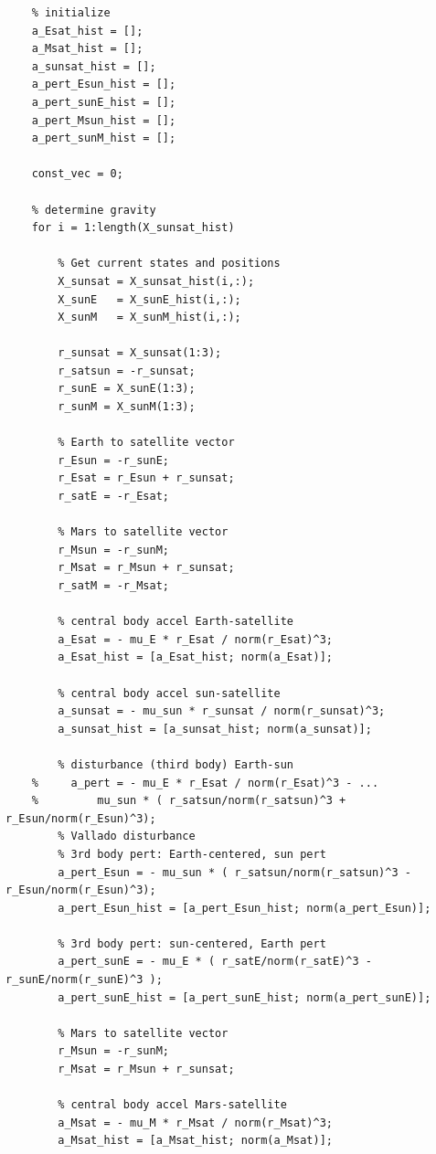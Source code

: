 \documentclass[conf]{new-aiaa}
\begin{document}
\begin{lstlisting}
    % initialize 
    a_Esat_hist = []; 
    a_Msat_hist = []; 
    a_sunsat_hist = []; 
    a_pert_Esun_hist = []; 
    a_pert_sunE_hist = []; 
    a_pert_Msun_hist = []; 
    a_pert_sunM_hist = []; 
    
    const_vec = 0; 
    
    % determine gravity 
    for i = 1:length(X_sunsat_hist) 
        
        % Get current states and positions 
        X_sunsat = X_sunsat_hist(i,:); 
        X_sunE   = X_sunE_hist(i,:); 
        X_sunM   = X_sunM_hist(i,:); 
    
        r_sunsat = X_sunsat(1:3); 
        r_satsun = -r_sunsat; 
        r_sunE = X_sunE(1:3); 
        r_sunM = X_sunM(1:3); 
        
        % Earth to satellite vector 
        r_Esun = -r_sunE;    
        r_Esat = r_Esun + r_sunsat; 
        r_satE = -r_Esat; 
        
        % Mars to satellite vector 
        r_Msun = -r_sunM; 
        r_Msat = r_Msun + r_sunsat; 
        r_satM = -r_Msat; 
    
        % central body accel Earth-satellite
        a_Esat = - mu_E * r_Esat / norm(r_Esat)^3; 
        a_Esat_hist = [a_Esat_hist; norm(a_Esat)]; 
        
        % central body accel sun-satellite 
        a_sunsat = - mu_sun * r_sunsat / norm(r_sunsat)^3; 
        a_sunsat_hist = [a_sunsat_hist; norm(a_sunsat)]; 
        
        % disturbance (third body) Earth-sun 
    %     a_pert = - mu_E * r_Esat / norm(r_Esat)^3 - ... 
    %         mu_sun * ( r_satsun/norm(r_satsun)^3 + r_Esun/norm(r_Esun)^3); 
        % Vallado disturbance 
        % 3rd body pert: Earth-centered, sun pert 
        a_pert_Esun = - mu_sun * ( r_satsun/norm(r_satsun)^3 - r_Esun/norm(r_Esun)^3); 
        a_pert_Esun_hist = [a_pert_Esun_hist; norm(a_pert_Esun)]; 
    
        % 3rd body pert: sun-centered, Earth pert 
        a_pert_sunE = - mu_E * ( r_satE/norm(r_satE)^3 - r_sunE/norm(r_sunE)^3 ); 
        a_pert_sunE_hist = [a_pert_sunE_hist; norm(a_pert_sunE)]; 
        
        % Mars to satellite vector 
        r_Msun = -r_sunM; 
        r_Msat = r_Msun + r_sunsat;
        
        % central body accel Mars-satellite 
        a_Msat = - mu_M * r_Msat / norm(r_Msat)^3; 
        a_Msat_hist = [a_Msat_hist; norm(a_Msat)]; 
        

\end{lstlisting}
\end{document}
